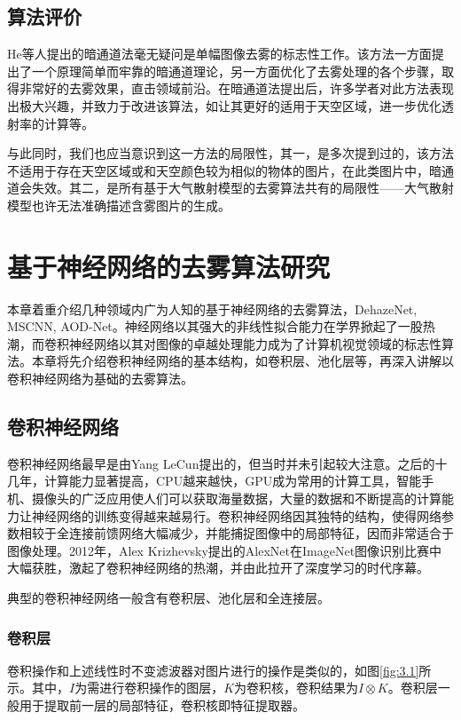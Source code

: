 \documentclass[a4paper, 12pt, oneside]{report}
\begin{document}
{\section{算法评价\quad}
He等人提出的暗通道法毫无疑问是单幅图像去雾的标志性工作。该方法一方面提出了一个原理简单而牢靠的暗通道理论，另一方面优化了去雾处理的各个步骤，取得非常好的去雾效果，直击领域前沿。在暗通道法提出后，许多学者对此方法表现出极大兴趣，并致力于改进该算法，如让其更好的适用于天空区域，进一步优化透射率的计算等。

与此同时，我们也应当意识到这一方法的局限性，其一，是多次提到过的，该方法不适用于存在天空区域或和天空颜色较为相似的物体的图片，在此类图片中，暗通道会失效。其二，是所有基于大气散射模型的去雾算法共有的局限性——大气散射模型也许无法准确描述含雾图片的生成。

\chapter{基于神经网络的去雾算法研究\quad}
本章着重介绍几种领域内广为人知的基于神经网络的去雾算法，DehazeNet, MSCNN, AOD-Net。神经网络以其强大的非线性拟合能力在学界掀起了一股热潮，而卷积神经网络以其对图像的卓越处理能力成为了计算机视觉领域的标志性算法。本章将先介绍卷积神经网络的基本结构，如卷积层、池化层等，再深入讲解以卷积神经网络为基础的去雾算法。

\section{卷积神经网络\quad}
卷积神经网络最早是由Yang LeCun提出的，但当时并未引起较大注意。之后的十几年，计算能力显著提高，CPU越来越快，GPU成为常用的计算工具，智能手机、摄像头的广泛应用使人们可以获取海量数据，大量的数据和不断提高的计算能力让神经网络的训练变得越来越易行。卷积神经网络因其独特的结构，使得网络参数相较于全连接前馈网络大幅减少，并能捕捉图像中的局部特征，因而非常适合于图像处理。2012年，Alex Krizhevsky提出的AlexNet在ImageNet图像识别比赛中大幅获胜，激起了卷积神经网络的热潮，并由此拉开了深度学习的时代序幕。

典型的卷积神经网络一般含有卷积层、池化层和全连接层。

\subsection{卷积层\quad}
卷积操作和上述线性时不变滤波器对图片进行的操作是类似的，如图\ref{fig:3.1}所示。其中，$I$为需进行卷积操作的图层，$K$为卷积核，卷积结果为$I\otimes K$。卷积层一般用于提取前一层的局部特征，卷积核即特征提取器。

}
\end{document}
